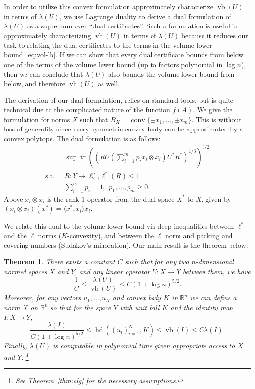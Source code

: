 \documentclass[11pt]{article}
\newtheorem{theorem}{Theorem}
\newcommand{\R}{{\mathbb{R}}}
\DeclareMathOperator{\hd}{hd}
\DeclareMathOperator{\vb}{vb}
\DeclareMathOperator{\conv}{conv}
\DeclareMathOperator{\tr}{tr}
\begin{document}
In order to utilize this convex formulation approximately characterize
$\vb(U)$ in terms of $\lambda(U)$, we use Lagrange duality to derive a
dual formulation of $\lambda(U)$ as a supremum over ``dual
certificates''. Such a formulation is useful in approximately
characterizing $\vb(U)$ in terms of $\lambda(U)$ because it reduces
our task to relating the dual certificates to the terms in
the volume lower bound~\eqref{eq:vol-lb}. If we can show that every
dual certificate bounds from below one of the terms of the volume
lower bound (up to factors polynomial in $\log n$), then we can
conclude that $\lambda(U)$ also bounds the volume lower bound from
below, and therefore $\vb(U)$ as well. 

The derivation of our dual formulation, relies on
standard tools, but is quite technical due to the complicated nature
of the function $f(A)$. We give the formulation for norms $X$ such
that $B_X = \conv\{\pm x_1, \ldots, \pm x_m\}$. This is without loss
of generality since every symmetric convex body can be approximated by
a convex polytope. The dual formulation is as follows:
\begin{align*}
  &\sup \tr((RU(\sum_{i = 1}^m{p_i x_i \otimes  x_i})U^*R^*)^{1/3})^{3/2}\\
  \text{s.t.}\ \ \ 
  &R: Y \to \ell_2^n, \ell^*(R) \le 1 \\
  &\sum_{i = 1}^m{p_i} = 1, \ \ 
  p_1, \ldots, p_m \ge 0. 
\end{align*}
Above $x_i \otimes x_i$ is the rank-1 operator from the dual space
$X^*$ to $X$, given by $(x_i \otimes x_i)(x^*) = \langle x^*,
x_i\rangle x_i$. 

We relate this dual to the volume lower bound via deep inequalities
between $\ell^*$ and the $\ell$ norms ($K$-convexity), and between the
$\ell$ norm and packing and covering numbers (Sudakov's
minoration). Our main result is the theorem below.

\begin{theorem}\label{thm:fact-main}
  There exists a constant $C$ such that for any two $n$-dimensional
  normed spaces $X$ and $Y$, and any linear operator $U:X \to Y$
  between them, we have
  \[
  \frac1C \le \frac{\lambda(U)}{\vb(U)} \le C (1 + \log n)^{5/2}.
  \]
  Moreover, for any vectors $u_1, \ldots, u_N$ and convex body $K$ in
  $\R^n$ we can define a norm $X$ on $\R^n$ so that for the space $Y$
  with unit ball $K$ and the identity map $I:X \to Y$,
  \[
  \frac{\lambda(I)}{C(1 + \log n)^{5/2}} 
  \le \hd((u_i)_{i = 1}^N, K) \le \vb(I) 
  \le C \lambda(I).
  \]
  Finally, $\lambda(U)$ is computable in polynomial time given
  appropriate access to $X$ and $Y$.
  \footnote{See Theorem~\ref{thm:alg} for the necessary assumptions.}
\end{theorem}
\end{document}
